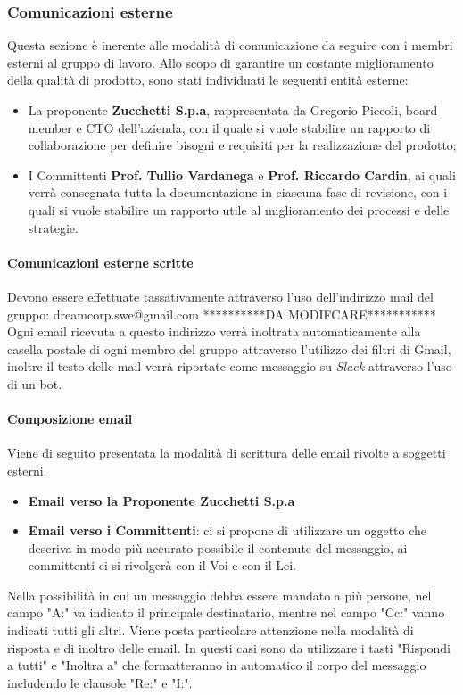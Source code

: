         \subsubsection{Comunicazioni esterne}
            Questa sezione è inerente alle modalità di comunicazione da seguire con i membri esterni al gruppo di lavoro.
            \newline
            Allo scopo di garantire un costante miglioramento della qualità di prodotto, sono stati individuati le seguenti entità esterne:
            \begin{itemize}
                \item La proponente \textbf{Zucchetti S.p.a}, rappresentata da Gregorio Piccoli, board member e CTO dell'azienda, con il quale si vuole stabilire un rapporto di collaborazione per definire bisogni e requisiti per la realizzazione del prodotto;
                \item I Committenti \textbf{Prof. Tullio Vardanega} e \textbf{Prof. Riccardo Cardin}, ai quali verrà consegnata tutta la documentazione in ciascuna fase di revisione, con i quali si vuole stabilire un rapporto utile al miglioramento dei processi e delle strategie.
            \end{itemize}
            \paragraph{Comunicazioni esterne scritte} Devono essere effettuate tassativamente attraverso l'uso dell'indirizzo mail del gruppo:
            \newline
            dreamcorp.swe@gmail.com   **********DA MODIFCARE***********
            \newline
            Ogni email ricevuta a questo indirizzo verrà inoltrata automaticamente alla casella postale di ogni membro del gruppo attraverso l'utilizzo dei filtri di Gmail, inoltre il testo delle mail verrà riportate come messaggio su \textit{Slack} attraverso l'uso di un bot.
            \paragraph{Composizione email}
            Viene di seguito presentata la modalità di scrittura delle email rivolte a soggetti esterni.
            \begin{itemize}
                \item \textbf{Email verso la Proponente Zucchetti S.p.a} 
                \item \textbf{Email verso i Committenti}: ci si propone di utilizzare un oggetto che descriva in modo più accurato possibile il contenute del messaggio, ai committenti ci si rivolgerà con il Voi e con il Lei.
            \end{itemize}
            Nella possibilità in cui un messaggio debba essere mandato a più persone, nel campo "A:" va indicato il principale destinatario, mentre nel campo "Cc:" vanno indicati tutti gli altri.
            Viene posta particolare attenzione nella modalità di risposta e di inoltro delle email. In questi casi sono da utilizzare i tasti "Rispondi a tutti" e "Inoltra a" che formatteranno in automatico il corpo del messaggio includendo le clausole "Re:" e "I:".
